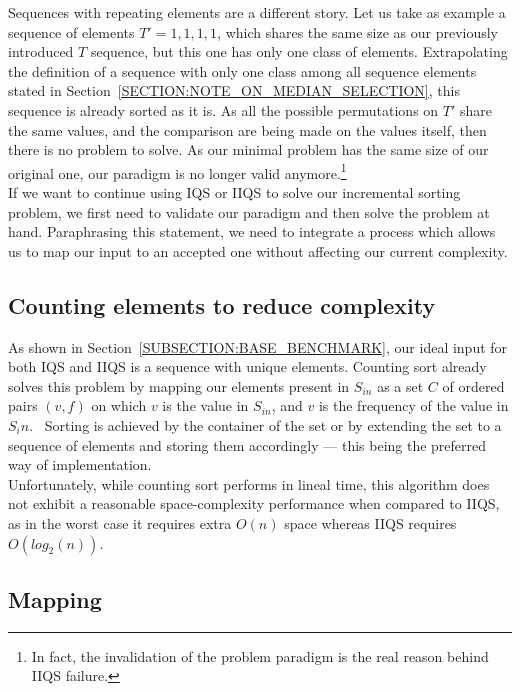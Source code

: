 Sequences with repeating elements are a different story. Let us take as example a sequence of elements $T'={1,1,1,1}$, which shares the same size as our previously introduced $T$ sequence, but this one has only one class of elements. Extrapolating the definition of a sequence with only one class among all sequence elements stated in Section~\ref{SECTION:NOTE_ON_MEDIAN_SELECTION}, this sequence is already sorted as it is. As all the possible permutations on $T'$ share the same values, and the comparison are being made on the values itself, then there is no problem to solve. As our minimal problem has the same size of our original one, our paradigm is no longer valid anymore.\footnote{In fact, the invalidation of the problem paradigm is the real reason behind IIQS failure.}\\

If we want to continue using IQS or IIQS to solve our incremental sorting problem, we first need to validate our paradigm and then solve the problem at hand. Paraphrasing this statement, we need to integrate a process which allows us to map our input to an accepted one without affecting our current complexity.\\

\subsection{Counting elements to reduce complexity}

As shown in Section~\ref{SUBSECTION:BASE_BENCHMARK}, our ideal input for both IQS and IIQS is a sequence with unique elements. Counting sort already solves this problem by mapping our elements present in $S_{in}$ as a set $C$ of ordered pairs $(v,f)$ on which $v$ is the value in $S_{in}$, and $v$ is the frequency of the value in $S_in$.~\cite{10.5555/280635} Sorting is achieved by the container of the set or by extending the set to a sequence of elements and storing them accordingly --- this being the preferred way of implementation. \\

Unfortunately, while counting sort performs in lineal time, this algorithm does not exhibit a reasonable space-complexity performance when compared to IIQS, as in the worst case it requires extra $O(n)$ space whereas IIQS requires $O(log_2(n))$.\\

\subsection{Mapping}
\label{SECTION:MAPPING}

